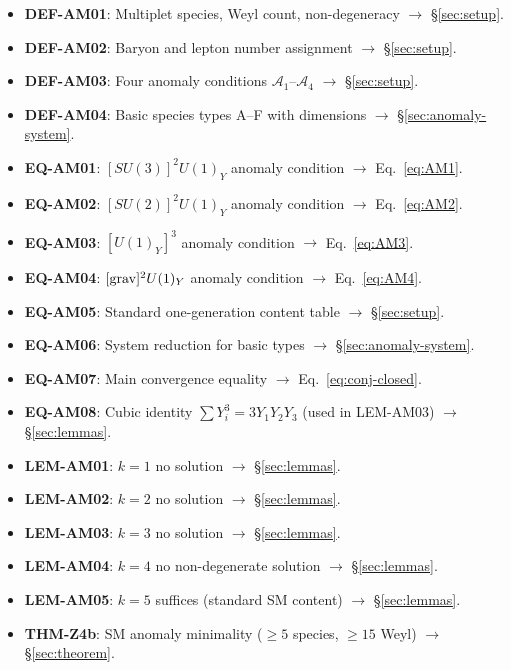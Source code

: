 \documentclass[12pt, a4paper]{article}
\begin{document}
\begin{formalbox}[title={Atomic units introduced by TASK-ZC09 (Z4b)}]
\begin{itemize}[leftmargin=*]
  \item \textbf{DEF-AM01}: Multiplet species, Weyl count, non-degeneracy
    $\to$ \S\ref{sec:setup}.
  \item \textbf{DEF-AM02}: Baryon and lepton number assignment
    $\to$ \S\ref{sec:setup}.
  \item \textbf{DEF-AM03}: Four anomaly conditions
    $\mathcal{A}_1$--$\mathcal{A}_4$
    $\to$ \S\ref{sec:setup}.
  \item \textbf{DEF-AM04}: Basic species types A--F with dimensions
    $\to$ \S\ref{sec:anomaly-system}.
  \item \textbf{EQ-AM01}: $[SU(3)]^2 U(1)_Y$ anomaly condition
    $\to$ Eq.~\eqref{eq:AM1}.
  \item \textbf{EQ-AM02}: $[SU(2)]^2 U(1)_Y$ anomaly condition
    $\to$ Eq.~\eqref{eq:AM2}.
  \item \textbf{EQ-AM03}: $[U(1)_Y]^3$ anomaly condition
    $\to$ Eq.~\eqref{eq:AM3}.
  \item \textbf{EQ-AM04}: $[{\rm grav}]^2 U(1)_Y$ anomaly condition
    $\to$ Eq.~\eqref{eq:AM4}.
  \item \textbf{EQ-AM05}: Standard one-generation content table
    $\to$ \S\ref{sec:setup}.
  \item \textbf{EQ-AM06}: System reduction for basic types
    $\to$ \S\ref{sec:anomaly-system}.
  \item \textbf{EQ-AM07}: Main convergence equality
    $\to$ Eq.~\eqref{eq:conj-closed}.
  \item \textbf{EQ-AM08}: Cubic identity $\sum Y_i^3 = 3 Y_1 Y_2 Y_3$
    (used in LEM-AM03) $\to$ \S\ref{sec:lemmas}.
  \item \textbf{LEM-AM01}: $k = 1$ no solution $\to$ \S\ref{sec:lemmas}.
  \item \textbf{LEM-AM02}: $k = 2$ no solution $\to$ \S\ref{sec:lemmas}.
  \item \textbf{LEM-AM03}: $k = 3$ no solution $\to$ \S\ref{sec:lemmas}.
  \item \textbf{LEM-AM04}: $k = 4$ no non-degenerate solution
    $\to$ \S\ref{sec:lemmas}.
  \item \textbf{LEM-AM05}: $k = 5$ suffices (standard SM content)
    $\to$ \S\ref{sec:lemmas}.
  \item \textbf{THM-Z4b}: SM anomaly minimality ($\geq 5$ species,
    $\geq 15$ Weyl) $\to$ \S\ref{sec:theorem}.

\end{itemize}
\end{formalbox}
\end{document}
